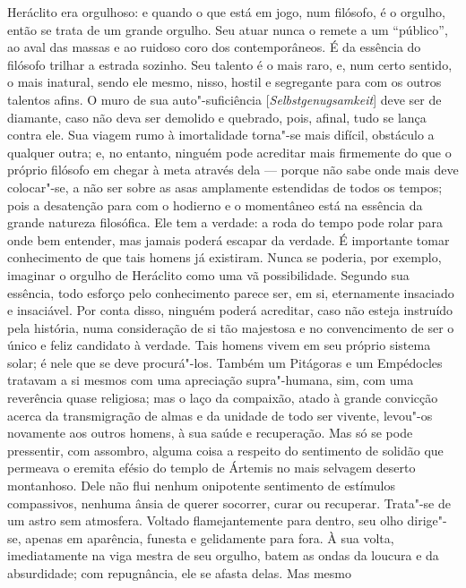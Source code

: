 Heráclito era orgulhoso: e quando o que está em jogo, num filósofo, é o
orgulho, então se trata de um grande orgulho. Seu atuar nunca o remete a um
``público'', ao aval das massas e ao ruidoso coro dos contemporâneos. É da
essência do filósofo trilhar a estrada sozinho. Seu talento é o mais raro, e,
num certo sentido, o mais inatural, sendo ele mesmo, nisso, hostil e
segregante para com os outros talentos afins. O muro de sua auto"-suficiência 
[\textit{Selbstgenugsamkeit}] deve ser de diamante, caso não deva ser demolido 
e quebrado, pois, afinal, tudo se lança contra ele. Sua viagem rumo à 
imortalidade torna"-se mais difícil, obstáculo a qualquer
outra; e, no entanto, ninguém pode acreditar mais firmemente do que o próprio
filósofo em chegar à meta através dela --- porque não sabe onde mais deve 
colocar"-se, a não ser sobre as asas amplamente estendidas de todos os tempos; 
pois a desatenção para com o
   hodierno e o momentâneo está na essência da grande natureza filosófica.
   Ele tem a verdade: a roda do tempo pode rolar para onde bem entender, mas
   jamais poderá escapar da verdade. É importante tomar conhecimento de que
   tais homens já existiram. Nunca se poderia, por exemplo, imaginar o
   orgulho de Heráclito como uma vã possibilidade. Segundo sua essência, todo
   esforço pelo conhecimento parece ser, em si, eternamente insaciado e
   insaciável. Por conta disso, ninguém poderá acreditar, caso não esteja
   instruído pela história, numa consideração de si tão majestosa e no
   convencimento de ser o único e feliz candidato à verdade. Tais homens
   vivem em seu próprio sistema solar; é nele que se deve procurá"-los.
   Também um Pitágoras e um Empédocles tratavam a si mesmos com uma
   apreciação supra"-humana, sim, com uma reverência quase religiosa; mas o
   laço da compaixão, atado à grande convicção acerca da transmigração de
   almas e da unidade de todo ser vivente, levou"-os novamente aos outros
   homens, à sua saúde e recuperação. Mas só se pode pressentir, com
   assombro, alguma coisa a respeito do sentimento de solidão que permeava o
   eremita efésio do templo de Ártemis no mais selvagem deserto montanhoso.
   Dele não flui nenhum onipotente sentimento de estímulos compassivos,
   nenhuma ânsia de querer socorrer, curar ou recuperar. Trata"-se de um
   astro sem atmosfera. Voltado flamejantemente para dentro, seu olho
   dirige"-se, apenas em aparência, funesta e gelidamente para fora. À sua
   volta, imediatamente na viga mestra de seu orgulho, batem as ondas da
   loucura e da absurdidade; com repugnância, ele se afasta delas. Mas mesmo
